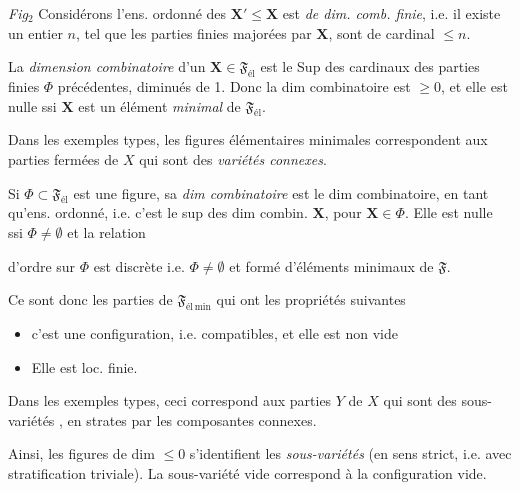 \documentclass[11pt,a4paper]{article}
\begin{document}
\emph{Fig$_2$}  Considérons l'ens. ordonné des $\mathbf{X}' \leq \mathbf{X}$ est \emph{de dim. comb. finie}, i.e. il existe un entier $n$, tel que les parties finies \struck{\ill{}} majorées par $\mathbf{X}$,  sont de cardinal $\leq n$.

La \emph{dimension combinatoire} d'un $\mathbf{X} \in \mathfrak{F}_{\mathrm{él}}$ est le Sup des cardinaux des parties finies $\Phi$ précédentes, diminués de 1. Donc la dim combinatoire est $\geq 0$, et elle est nulle ssi $\mathbf{X}$ est un élément \emph{minimal} de $\mathfrak{F}_{\mathrm{él}}$.

Dans les exemples types,  les figures élémentaires minimales correspondent aux parties fermées de $X$ qui sont des \emph{variétés connexes}.

Si $\Phi \subset \mathfrak{F}_{\mathrm{él}}$ est une figure, sa \emph{dim combinatoire} est le dim combinatoire, en tant qu'ens. ordonné, i.e. c'est le sup des dim combin. $\mathbf{X}$, pour $\mathbf{X} \in \Phi$. Elle est nulle ssi $\Phi \neq \emptyset$ et  la relation

d'ordre sur $\Phi$ est discrète i.e. $\Phi \neq \emptyset$ et formé d'éléments minimaux de $\mathfrak{F}$.

Ce sont donc les   parties de $\mathfrak{F}_{\mathrm{él}\,\mathrm{min}}$ qui ont les propriétés suivantes
\begin{itemize}
  \item[a)] c'est une configuration, i.e.   compatibles, et elle est non vide
  \item[b)] Elle est loc. finie.
\end{itemize}

Dans les exemples types, ceci correspond aux parties  $Y$ de $X$ qui sont des sous-variétés ,  en strates par les composantes connexes.

Ainsi, les figures de dim $\leq 0$ s'identifient les \emph{sous-variétés} (en sens strict, i.e. avec stratification triviale). La sous-variété vide correspond à la configuration vide.
\end{document}
